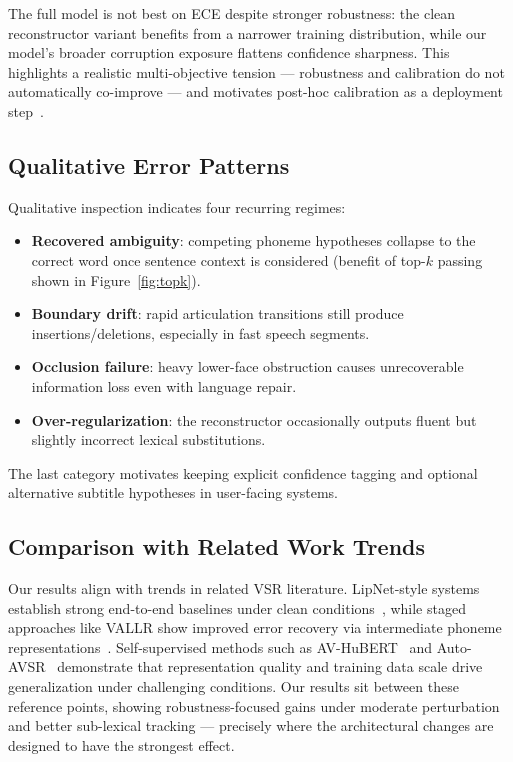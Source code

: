 \documentclass[10pt,twocolumn,letterpaper]{article}
\begin{document}
The full model is not best on ECE despite stronger robustness: the clean reconstructor variant benefits from a narrower training distribution, while our model's broader corruption exposure flattens confidence sharpness. This highlights a realistic multi-objective tension — robustness and calibration do not automatically co-improve — and motivates post-hoc calibration as a deployment step~\cite{hong2023watchorlisten}.

\subsection{Qualitative Error Patterns}
Qualitative inspection indicates four recurring regimes:
\begin{itemize}[leftmargin=*]
    \item \textbf{Recovered ambiguity}: competing phoneme hypotheses collapse to the correct word once sentence context is considered (benefit of top-$k$ passing shown in Figure~\ref{fig:topk}).
    \item \textbf{Boundary drift}: rapid articulation transitions still produce insertions/deletions, especially in fast speech segments.
    \item \textbf{Occlusion failure}: heavy lower-face obstruction causes unrecoverable information loss even with language repair.
    \item \textbf{Over-regularization}: the reconstructor occasionally outputs fluent but slightly incorrect lexical substitutions.
\end{itemize}
The last category motivates keeping explicit confidence tagging and optional alternative subtitle hypotheses in user-facing systems.

\subsection{Comparison with Related Work Trends}
Our results align with trends in related VSR literature. LipNet-style systems establish strong end-to-end baselines under clean conditions~\cite{assael2016lipnet}, while staged approaches like VALLR show improved error recovery via intermediate phoneme representations~\cite{thomas2025vallr}. Self-supervised methods such as AV-HuBERT~\cite{shi2022avhubert,shi2022robust} and Auto-AVSR~\cite{ma2023autoavsr} demonstrate that representation quality and training data scale drive generalization under challenging conditions. Our results sit between these reference points, showing robustness-focused gains under moderate perturbation and better sub-lexical tracking — precisely where the architectural changes are designed to have the strongest effect.
\end{document}

